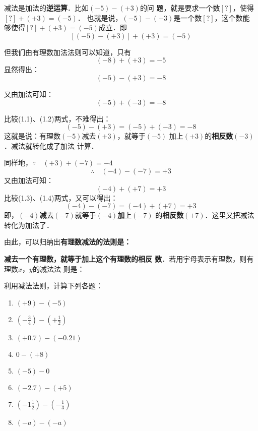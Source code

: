 减法是加法的\textbf{逆运算}．比如$(-5)-(+3)$的问
题，就是要求一个数$[?]$，使得$[?]+(+3)=(-5)$．
也就是说，$(-5)-(+ 3)$是一个数$[?]$，这个数能
够使得$[?]+(+3)=(-5)$成立．即
$$[(-5)-(+3) ]+(+3)=(-5)$$

    但我们由有理数加法法则可以知道，只有
\[(-8)+(+3)=-5\]
显然得出：
\begin{equation}
    (-5)-(+3)=-8
\end{equation}

又由加法可知：
\begin{equation}
    (-5)+(-3)=-8
\end{equation}

比较(1.1)、(1.2)两式，不难得出：
     \[ (-5)-(+3)=(-5)+(-3)=-8\]
这就是说：有理数$(-5)$减去$(+ 3)$，就等于$(-5)$
加上$(+ 3)$的\textbf{相反数}$(-3)$．减法就转化成了加法
计算．

    同样地，$\because\quad (+3)+(-7)=-4$
    \begin{equation}
     \therefore\quad    (-4)-(-7)=+3
    \end{equation}    
    又由加法可知：
    \begin{equation}
        (-4)+(+7)=+3
    \end{equation}
    比较(1.3)、(1.4)两式，又可以得出：
    \[ (-4)-(-7)= (-4)+(+7)=+3\]
    即，$(-4)$\textbf{减}去$(-7)$就等于$(-4)$\textbf{加}上$(-7)$
    的\textbf{相反数}$(+7)$．这里又把减法转化为加法了．

        由此，可以归纳出\textbf{有理数减法的法则是：}

        \textbf{减去一个有理数，就等于加上这个有理数的相反
    数}．若用宇母表示有理数，则有理数$x$，$y$的减法法
    则是：
    
\begin{center}
\end{center}

\begin{example}
    利用减法法则，计算下列各题：
\begin{multicols}{2}
    \begin{enumerate}
        \item $(+9)-(-5)$
        \item $\left(-\frac{3}{4}\right)-\left(+\frac{1}{2}\right)$
        \item $(+0.7)-(-0.21)$
        \item $0-(+8)$
        \item $(-5)-0$
        \item $(-2.7)-(+5)$
        \item $\left(-1\frac{1}{2}\right)-\left(-\frac{1}{3}\right)$
        \item $(-a)-(-a)$
    \end{enumerate}
\end{multicols}
\end{example}

